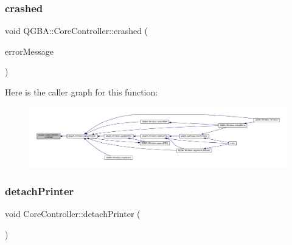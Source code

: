 \mbox{\label{class_q_g_b_a_1_1_core_controller_a68941609805ebefee0641cfac62fc01f}} 
\subsubsection{\texorpdfstring{crashed}{crashed}}
{\footnotesize\ttfamily void Q\+G\+B\+A\+::\+Core\+Controller\+::crashed (\begin{DoxyParamCaption}\item[{const Q\+String \&}]{error\+Message }\end{DoxyParamCaption})\hspace{0.3cm}{\ttfamily [signal]}}

Here is the caller graph for this function\+:
\nopagebreak
\begin{figure}[H]
\begin{center}
\leavevmode
\includegraphics[width=350pt]{class_q_g_b_a_1_1_core_controller_a68941609805ebefee0641cfac62fc01f_icgraph}
\end{center}
\end{figure}
\mbox{\label{class_q_g_b_a_1_1_core_controller_a0cafa561225bd09a8629308589130f68}} 
\subsubsection{\texorpdfstring{detach\+Printer}{detachPrinter}}
{\footnotesize\ttfamily void Core\+Controller\+::detach\+Printer (\begin{DoxyParamCaption}{ }\end{DoxyParamCaption})\hspace{0.3cm}{\ttfamily [slot]}}

